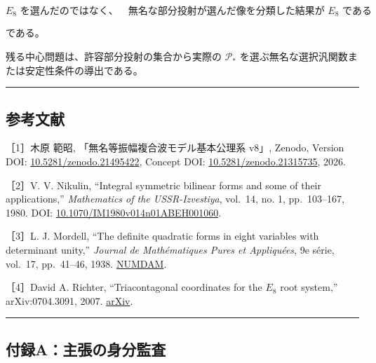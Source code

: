 \documentclass[
  a4paper,
  ja=minimal,
  xelatex,
  paragraph-mark={},
]{bxjsarticle}
\begin{document}
\[
\boxed{
\text{$E_8$ を選んだのではなく、}
\quad
\text{無名な部分投射が選んだ像を分類した結果が $E_8$ である}
}
\]

である。

残る中心問題は、許容部分投射の集合から実際の \(\mathcal P_*\)
を選ぶ無名な選択汎関数または安定性条件の導出である。

\begin{center}\rule{0.5\linewidth}{0.5pt}\end{center}

\subsection{参考文献}\label{ux53c2ux8003ux6587ux732e}

［1］木原 範昭, 「無名等振幅複合波モデル基本公理系 v8」, Zenodo, Version
DOI:
\href{https://doi.org/10.5281/zenodo.21495422}{10.5281/zenodo.21495422},
Concept DOI:
\href{https://doi.org/10.5281/zenodo.21315735}{10.5281/zenodo.21315735},
2026.

［2］V. V. Nikulin, ``Integral symmetric bilinear forms and some of
their applications,'' \emph{Mathematics of the USSR-Izvestiya}, vol.~14,
no. 1, pp.~103--167, 1980. DOI:
\href{https://doi.org/10.1070/IM1980v014n01ABEH001060}{10.1070/IM1980v014n01ABEH001060}.

［3］L. J. Mordell, ``The definite quadratic forms in eight variables
with determinant unity,'' \emph{Journal de Mathématiques Pures et
Appliquées}, 9e série, vol.~17, pp.~41--46, 1938.
\href{https://www.numdam.org/item/JMPA_1938_9_17_1-4_41_0/}{NUMDAM}.

［4］David A. Richter, ``Triacontagonal coordinates for the \(E_8\) root
system,'' arXiv:0704.3091, 2007.
\href{https://arxiv.org/abs/0704.3091}{arXiv}.

\begin{center}\rule{0.5\linewidth}{0.5pt}\end{center}

\subsection{付録A：主張の身分監査}\label{ux4ed8ux9332aux4e3bux5f35ux306eux8eabux5206ux76e3ux67fb}
\end{document}
